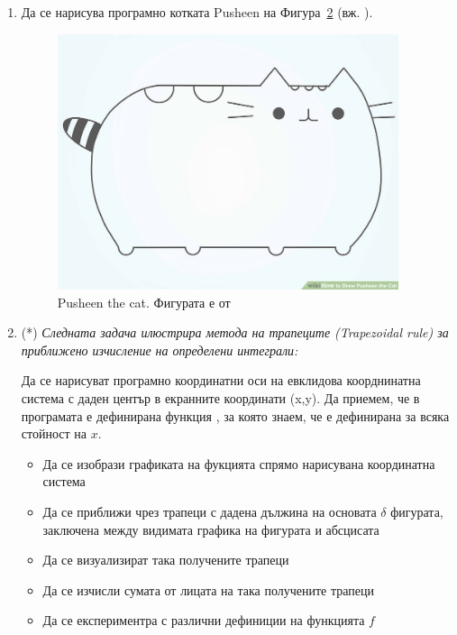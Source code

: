 {\begin{enumerate}[resume]
\begin{figure}
      \caption{Рисуване на петоъгълник чрез намиране на 5 равноотдалечени точки по окръжността с радиус $r$ и център $(x_0,y_0)$}
      \label{fig:pentagon}
    \end{figure}




	\item Да се нарисува програмно котката Pusheen на Фигура~\ref{fig:pusheen} (вж. \cite{pusheen}).

  \begin{figure}
  \centering
	\includegraphics[width=10cm]{images/pusheen}
  \caption {Pusheen the cat. Фигурата е от \cite{pusheen}}
  \label{fig:pusheen}
  \end{figure}


  \item(*) \textit{Следната задача илюстрира метода на трапеците (Trapezoidal rule) за приближено изчисление на определени интеграли:}

	Да се нарисуват програмно координатни оси на евклидова коорднинатна система с даден център в екранните координати (x,y). Да приемем, че в програмата е дефинирана функция , за която знаем, че е дефинирана за всяка стойност на $x$.

	\begin{itemize}
		\item Да се изобрази графиката на фукцията спрямо нарисувана координатна система
		\item Да се приближи чрез трапеци с дадена дължина на основата $\delta$ фигурата, заключена между видимата графика на фигурата и абсцисата
		\item Да се визуализират така получените трапеци
		\item Да се изчисли сумата от лицата на така получените трапеци
		\item Да се експериментра с различни дефиниции на функцията $f$
	\end{itemize}



\end{enumerate}}
